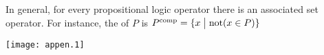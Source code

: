 In general, for every propositional logic operator there is an associated set
operator.
For instance, the 
of \( P \) is
\( P^{\text{comp}}=\mbox{$\{x\bigm| \text{not$( x\in P)$}\}$} \)
\begin{center}
  \texttt{[image: appen.1]}
%
%
%
%
%
%

\end{center}
